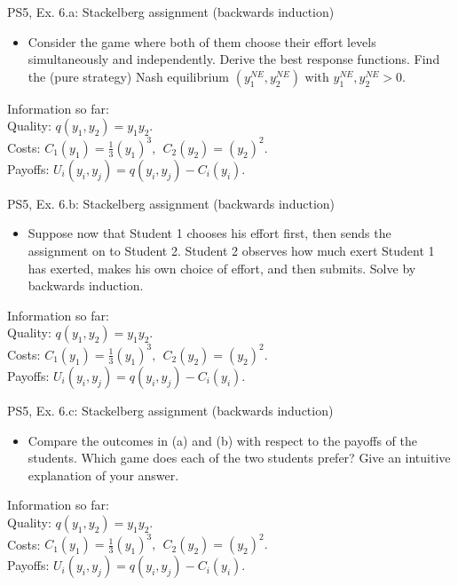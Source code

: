 \begin{frame}{PS5, Ex. 6.a: Stackelberg assignment (backwards induction)}
  \begin{itemize}
    \item[(a)] Consider the game where both of them choose their effort levels simultaneously and independently. Derive the best response functions. Find the (pure strategy) Nash equilibrium $(y_1^{NE}, y_2^{NE})$ with $y_1^{NE}, y_2^{NE} > 0$.
  \end{itemize}
  \begin{multicols}{2}
    \vfill\null \columnbreak
    Information so far:\\\medskip
    Quality: $q(y_1, y_2) = y_1y_2.$\\
    Costs: $C_1(y_1) = \frac{1}{3}(y_1)^3,\ \ C_2(y_2) = (y_2)^2.$\\
    Payoffs: $U_i(y_i,y_j) = q(y_i,y_j)-C_i(y_i).$
  \end{multicols}
\end{frame}

\begin{frame}{PS5, Ex. 6.b: Stackelberg assignment (backwards induction)}
  \begin{itemize}
    \item[(b)] Suppose now that Student 1 chooses his effort first, then sends the assignment on to Student 2. Student 2 observes how much exert Student 1 has exerted, makes his own choice of effort, and then submits. Solve by backwards induction.
  \end{itemize}
  \begin{multicols}{2}
    \vfill\null \columnbreak
    Information so far:\\\medskip
    Quality: $q(y_1, y_2) = y_1y_2.$\\
    Costs: $C_1(y_1) = \frac{1}{3}(y_1)^3,\ \ C_2(y_2) = (y_2)^2.$\\
    Payoffs: $U_i(y_i,y_j) = q(y_i,y_j)-C_i(y_i).$
  \end{multicols}
\end{frame}

\begin{frame}{PS5, Ex. 6.c: Stackelberg assignment (backwards induction)}
  \begin{itemize}
    \item[(c)] Compare the outcomes in (a) and (b) with respect to the payoffs of the students. Which game does each of the two students prefer? Give an intuitive explanation of your answer.
  \end{itemize}
  \begin{multicols}{2}
    \vfill\null \columnbreak
    Information so far:\\\medskip
    Quality: $q(y_1, y_2) = y_1y_2.$\\
    Costs: $C_1(y_1) = \frac{1}{3}(y_1)^3,\ \ C_2(y_2) = (y_2)^2.$\\
    Payoffs: $U_i(y_i,y_j) = q(y_i,y_j)-C_i(y_i).$
  \end{multicols}
\end{frame}

